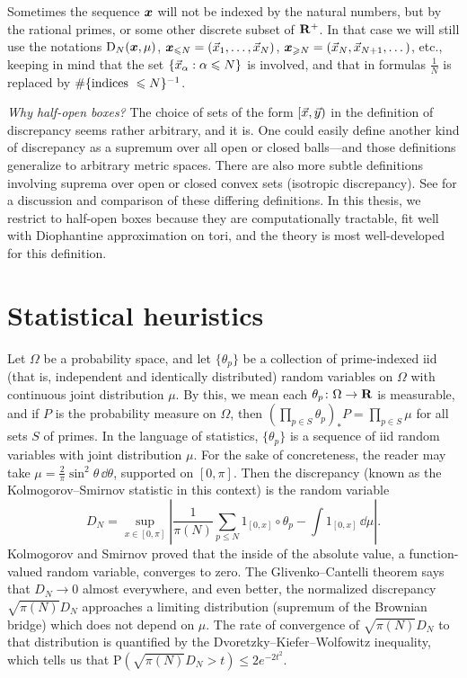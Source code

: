 Sometimes the sequence ${\boldsymbol x}$ will not be indexed by the natural numbers, but 
by the rational primes, or some other discrete subset of $\mathbf{R}^+$. In that case 
we will still use the notations $\operatorname{D}_N({\boldsymbol x},\mu)$, 
${\boldsymbol x}_{\leqslant N} = (\vec{x}_1,\dots,\vec{x}_N)$, 
${\boldsymbol x}_{\geqslant N} = (\vec{x}_N,\vec{x}_{N+1},\dots)$, etc., 
keeping in mind that the set $\{\vec{x}_\alpha : \alpha \leqslant N\}$ is involved, 
and that in formulas $\frac{1}{N}$ is replaced by 
$\#\{\textnormal{indices }\leqslant N\}^{-1}$. 

\emph{Why half-open boxes?} The choice of sets of the form $[\vec{x},\vec{y})$ in the 
definition of discrepancy seems rather arbitrary, and it is. One could easily 
define another kind of discrepancy as a supremum over all open or closed 
balls---and 
those  definitions generalize to arbitrary metric spaces. There are also more 
subtle definitions involving suprema over open or closed convex sets 
(isotropic discrepancy). See \cite{kuipers-niederreiter-1974} for a discussion 
and comparison of these differing definitions. In this thesis, we restrict to 
half-open boxes because they are computationally tractable, fit well with 
Diophantine approximation on tori, and the theory is most well-developed for 
this definition. 





\section{Statistical heuristics}

Let $\Omega$ be a probability space, and let $\{\theta_p\}$ be a collection of 
prime-indexed iid (that is, independent and identically distributed) 
random variables on 
$\Omega$ with continuous joint distribution $\mu$. By this, we mean each 
$\theta_p\colon \Omega \to \mathbf{R}$ is measurable, and if $P$ is the probability 
measure on $\Omega$, then 
$\left(\prod_{p\in S} \theta_p\right)_\ast P = \prod_{p\in S} \mu$ for all 
sets $S$ of primes. In 
the language of statistics, $\{\theta_p\}$ is a sequence of iid random 
variables with joint distribution $\mu$. For the sake of concreteness, the 
reader may take $\mu = \frac{2}{\pi} \sin^2 \theta\, \dd\theta$, 
supported on $[0,\pi]$. Then the discrepancy (known as the 
Kolmogorov--Smirnov statistic in this context) is the random variable 
\[
	D_N = \sup_{x\in [0,\pi]} \left|\frac{1}{\pi(N)} \sum_{p\leqslant N} 1_{[0,x]}\circ \theta_p - \int 1_{[0,x]}\, \dd\mu\right| .
\]
Kolmogorov and Smirnov proved that the inside of the absolute value, a 
function-valued random variable, converges 
to zero. The Glivenko--Cantelli theorem says that $D_N \to 0$ almost everywhere, 
and even better, the normalized discrepancy $\sqrt{\pi(N)} D_N$ approaches 
a limiting distribution (supremum of the Brownian bridge) which does not 
depend on $\mu$. The rate of convergence of $\sqrt{\pi(N)} D_N$ to that 
distribution is quantified by the Dvoretzky--Kiefer--Wolfowitz inequality, 
which tells us that 
$\mathrm{P}\left(\sqrt{\pi(N)} D_N > t\right) \leqslant 2 e^{-2 t^2}$. 

